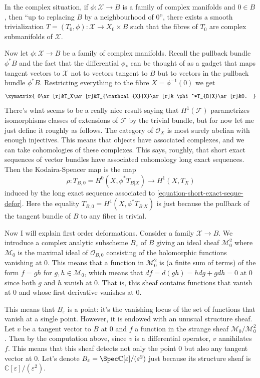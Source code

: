 \documentclass{book}
\begin{document}
In the complex situation, if
$\phi:\mathcal{X} \to B$ is a family
of complex manifolds and $0 \in B$, then
``up to replacing $B$ by a neighbourhood of
0'',
there exists a smooth trivialization
$T=(T_0,\phi):\mathcal{X} \to X_0 \times B$
such that the fibres of $T_0$ are complex
submanifolds of $\mathcal{X}$.

Now let $\phi:\mathcal{X} \to B$ be a family
of complex manifolds.
Recall the pullback bundle $\phi^*B$ and the
fact
that the differential $\phi_*$ can be thought
of as a gadget
that maps tangent vectors to $\mathcal{X}$
not to vectors tangent to $B$ but
to vectors in the pullback bundle $\phi^*B$.
Restricting everything to the fibre
$X=\phi^{-1}(0)$ we get
\begin{equation}
\label{equation-short-exact-seque-defor}
\xymatrix{
0\ar[r]&T_X\ar[r]&T_{\mathcal{X}|X}\ar[r]&
\phi^*T_{B|X}\ar[r]&0.
}
\end{equation}
There's what seems to be a really nice result
saying that
$H^1(\mathcal{F})$ parametrizes isomorphisms
classes
of extensions of $\mathcal{F}$ by the trivial
bundle,
but for now let me just define it roughly as
follows.
The category of $\mathcal{O}_X$ is most
surely abelian
with enough injectives. This means that
objects
have associated complexes, and we can take
cohomologies of these complexes.
This says, roughly, that short exact
sequences of vector bundles have associated
cohomology
long exact sequences. Then the
Kodaira-Spencer map
is the map
$$
\rho:T_{B,0}=H^0(X,\phi^* T_{B|X})\to
H^1(X,T_X)
$$
induced by the long exact sequence associated
to
\ref{equation-short-exact-seque-defor}.
Here the equality $T_{B,0}=H^1(X,\phi^*
T_{B|X})$
is just because the pullback of the tangent
bundle of $B$
to any fiber is trivial.

\medskip\noindent
Now I will explain first order deformations.
Consider a family $\mathcal{X} \to B$.
We introduce a complex analytic subscheme
$B_\varepsilon$ of $B$
giving an ideal sheaf $\mathcal{M}^2_0$
where $\mathcal{M}_0$ is the maximal ideal
of $\mathcal{O}_{B,0}$ consisting of the
holomorphic
functions vanishing at 0.
This means that a function in
$\mathcal{M}^2_0$
is (a finite sum of terms) of the form $f=gh$
for $g,h \in \mathcal{M}_0$,
which means that $df=d(gh)=hdg+gdh=0$ at $0$
since both $g$ and $h$ vanish at $0$.
That is, this sheaf contains functions that
vanish
at $0$ and whose first derivative vanishes at
$0$.

This means that $B_\varepsilon$ is a point:
it's the vanishing locus of the set of
functions
that vanish at a single point.
However, it is endowed with an unusual
structure sheaf.
Let $v$ be a tangent vector to $B$ at $0$ and
$f$ a function in the strange sheaf
$\mathcal{M}_0/\mathcal{M}_0^2$.
Then by the computation above, since $v$ is a
differential
operator, $v$ annihilates $f$.
This means that this sheaf detects not only
the point $0$
but also any tangent vector at $0$.
Let's denote
$B_\varepsilon=\Spec
\mathbb{C}[\varepsilon]/(\varepsilon^2)$
just because its structure sheaf is
$\mathbb{C}[\varepsilon]/(\varepsilon^2)$.
\end{document}
